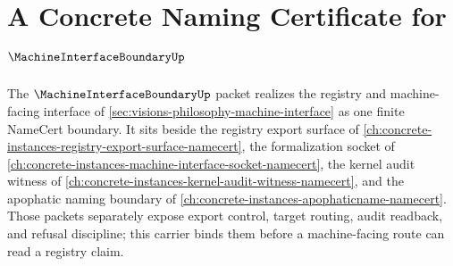 \chapter{A Concrete Naming Certificate for $\MachineInterfaceBoundaryUp$}
\label{ch:concrete-instances-machine-interface-boundary-namecert}

The $\MachineInterfaceBoundaryUp$ packet realizes the registry and machine-facing interface of \autoref{sec:visions-philosophy-machine-interface} as one finite NameCert boundary. It sits beside the registry export surface of \autoref{ch:concrete-instances-registry-export-surface-namecert}, the formalization socket of \autoref{ch:concrete-instances-machine-interface-socket-namecert}, the kernel audit witness of \autoref{ch:concrete-instances-kernel-audit-witness-namecert}, and the apophatic naming boundary of \autoref{ch:concrete-instances-apophaticname-namecert}. Those packets separately expose export control, target routing, audit readback, and refusal discipline; this carrier binds them before a machine-facing route can read a registry claim.

